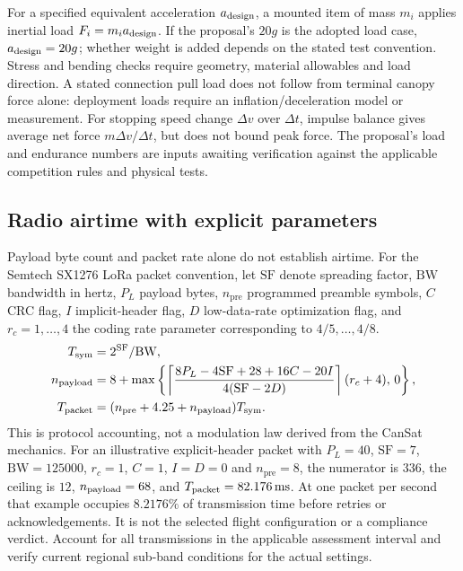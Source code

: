 For a specified equivalent acceleration $a_{\rm design}$, a mounted item
of mass $m_i$ applies inertial load $F_i=m_i a_{\rm design}$. If the
proposal's $20g$ is the adopted load case, $a_{\rm design}=20g$; whether
weight is added depends on the stated test convention. Stress and bending
checks require geometry, material allowables and load direction. A stated
connection pull load does not follow from terminal canopy force alone:
deployment loads require an inflation/deceleration model or measurement.
For stopping speed change $\Delta v$ over $\Delta t$, impulse balance
gives average net force $m\Delta v/\Delta t$, but does not bound peak force.
The proposal's load and endurance numbers are inputs awaiting verification
against the applicable competition rules and physical tests.

\subsection{Radio airtime with explicit parameters}

Payload byte count and packet rate alone do not establish airtime. For
the Semtech SX1276 LoRa packet convention, let $\mathrm{SF}$ denote
spreading factor, $\mathrm{BW}$ bandwidth in hertz, $P_L$ payload bytes,
$n_{\mathrm{pre}}$ programmed preamble symbols, $C$ CRC flag, $I$ implicit-header
flag, $D$ low-data-rate optimization flag, and $r_c=1,\ldots,4$ the coding
rate parameter corresponding to $4/5,\ldots,4/8$.
\begin{align}
 T_{\rm sym}&=2^{\mathrm{SF}}/\mathrm{BW},\\
 n_{\rm payload}&=8+\max\left\{
 \left\lceil\frac{8P_L-4\mathrm{SF}+28+16C-20I}
 {4(\mathrm{SF}-2D)}\right\rceil(r_c+4),\,0\right\},\\
 T_{\rm packet}&=(n_{\mathrm{pre}}+4.25+n_{\rm payload})T_{\rm sym}.
\end{align}
This is protocol accounting, not a modulation law derived from the CanSat
mechanics. For an illustrative explicit-header packet with $P_L=40$,
$\mathrm{SF}=7$, $\mathrm{BW}=125000$, $r_c=1$, $C=1$, $I=D=0$ and
$n_{\mathrm{pre}}=8$, the numerator is $336$, the ceiling is $12$,
$n_{\rm payload}=68$, and $T_{\rm packet}=82.176\,\mathrm{ms}$.
At one packet per second that example occupies $8.2176\%$ of transmission
time before retries or acknowledgements. It is not the selected flight
configuration or a compliance verdict. Account for all transmissions in
the applicable assessment interval and verify current regional sub-band
conditions for the actual settings.


